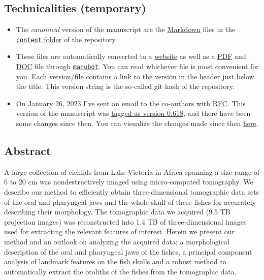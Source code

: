 \hypertarget{technicalities-temporary}{%
\subsection{Technicalities (temporary)}\label{technicalities-temporary}}

\begin{itemize}
\tightlist
\item
  The \emph{canonical} version of the manuscript are the \href{https://en.wikipedia.org/wiki/Markdown}{Markdown} files in the \href{https://github.com/habi/EAWAG-manuscript/tree/main/content}{\texttt{content} folder} of the repository.
\item
  These files are automatically converted to a \href{https//habi.github.io/EAWAGmanuscript/}{website} as well as a \href{https//habi.github.io/EAWAGmanuscript/manuscript.pdf}{PDF} and \href{https//github.com/habi/EAWAGmanuscript/raw/output/manuscript.docx}{DOC} file through \href{https//manubot.org/}{\texttt{manubot}}.
  You can read whichever file is most convenient for you.
  Each version/file contains a link to the version in the header just below the title.
  This version string is the so-called git hash of the repository.
\item
  On January 26, 2023 I've sent an email to the co-authors with \href{https//en.wikipedia.org/wiki/Request_for_Comments}{RFC}.
  This version of the manuscript was \href{https://github.com/habi/EAWAG-manuscript/releases/tag/v0.618}{tagged as version 0.618}, and there have been some changes since then.
  You can visualize the changes made since then \href{https://github.com/habi/EAWAG-manuscript/compare/v0.618...main}{here}.
\end{itemize}

\hypertarget{abstract}{%
\subsection{Abstract}\label{abstract}}

A large collection of cichlids from Lake Victoria in Africa spanning a size range of 6 to 20 cm was nondestructively imaged using micro-computed tomography.
We describe our method to efficiently obtain three-dimensional tomographic data sets of the oral and pharyngeal jaws and the whole skull of these fishes for accurately describing their morphology.
The tomographic data we acquired (9.5 TB projection images) was reconstructed into 1.4 TB of three-dimensional images used for extracting the relevant features of interest.
Herein we present our method and an outlook on analyzing the acquired data; a morphological description of the oral and pharyngeal jaws of the fishes, a principal component analysis of landmark features on the fish skulls and a robust method to automatically extract the otoliths of the fishes from the tomographic data.

